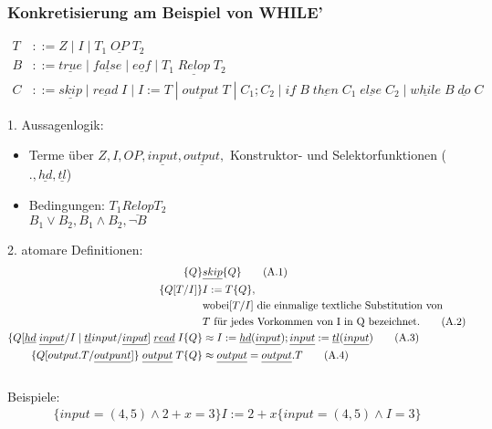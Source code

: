 \subsubsection{Konkretisierung am Beispiel von WHILE'}
\begin{align*}
T&::= Z\; |\; I\; |\; T_1\; \underline{OP}\; T_2\\
B&::= \underline{true}\; |\; \underline{false}\; |\; \underline{eof}\; |\; T_1\; \underline{Relop}\; T_2\\
C&::= \underline{skip}\; |\; \underline{read}\; I\; |\; I:=T\; |\; \underline{output}\; T\; |\; C_1;C_2\; |\; \underline{if}\;B\;\underline{then}\;C_1\;\underline{else}\;C_2\;|\;\underline{while}\;B\;\underline{do}\;C
\end{align*}
\begin{compactitem}
	\item[1.] Aussagenlogik:
	\begin{itemize}
		\item Terme über $Z, I, OP, \underline{input}, \underline{output},$ Konstruktor- und Selektorfunktionen ($., \underline{hd}, \underline{tl}$)
		\item Bedingungen: $T_1 \underline{Relop} T_2$\\
		$B_1 \lor B_2, B_1 \land B_2, \lnot B$ 
	\end{itemize}
	\item[2.] atomare Definitionen:\\
		\begin{align}
			\{Q\}&\underline{skip}\{Q\}\tag{A.1}\\
			\{Q[T/I]\}&I:=T\{Q\},\notag\\&\text{wobei}[T/I]\text{ die einmalige textliche Substitution von} \notag\\&T \text{ für jedes Vorkommen von I in Q bezeichnet.}\tag{A.2}\\
			\{Q[\underline{hd} \; \underline{input}/I\; |\; \underline{tl} input / \underline{input}]\;\underline{read}\; I \{Q\} &\approx I:= \underline{hd}(\underline{
			input}); \underline{input} := \underline{tl} (\underline{input}) \tag{A.3}\\
			\{Q[output.T / \underline{outpunt}]\}\;\underline{output}\;T \{Q\} &\approx \underline{output}=\underline{output}.T\tag{A.4}\\
			\notag
		\end{align}
		Beispiele:
		\begin{align*}
		\{input=(4,5)\land2+x=3\} I:=2+x \{input=(4,5)\land I=3\}
		\end{align*}

\end{compactitem}
